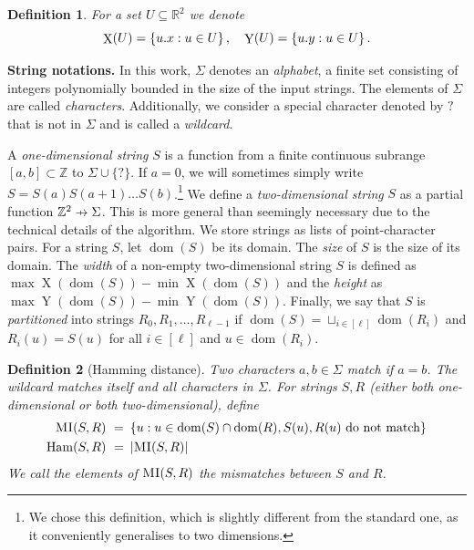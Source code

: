 \documentclass[twoside,leqno]{article}
\newtheorem{definition}{Definition}[section]
\newcommand{\R}{\mathbb{R}}
\newcommand{\Z}{\mathbb{Z}}
\newcommand{\set}[1]{\left\lbrace #1 \right\rbrace}
\DeclareMathOperator*{\X}{X}
\DeclareMathOperator*{\Y}{Y}
\DeclareMathOperator*{\Ham}{Ham}
\DeclareMathOperator*{\dom}{dom}
\DeclareMathOperator*{\chrome}{C}
\newcommand{\absolute}[1]{\left\lvert#1\right\rvert}
\begin{document}
\begin{definition}
	For a set $U \subseteq \R^2$ we denote
	\[ \X(U) = \set{\x{u} : u \in U}, \quad \Y(U) = \set{\y{u} : u \in U}.\]
\end{definition}


\newcommand{\wild}{\texttt{?}}
\noindent \textbf{String notations.} In this work, $\Sigma$ denotes an \emph{alphabet}, a finite set consisting of integers polynomially bounded in the size of the input strings. The elements of $\Sigma$ are called \emph{characters}. Additionally, we consider a special character denoted by $\wild$ that is not in $\Sigma$ and is called a \emph{wildcard}.

\newcommand{\getchar}[1]{\chrome(#1)}
\newcommand{\pto}{\mathrel{\ooalign{\hfil$\mapstochar\mkern5mu$\hfil\cr$\to$\cr}}}
\renewcommand{\d}[1]{\dom(#1)}
\newcommand{\f}[1]{#1^\mathbf{f}}

A \emph{one-dimensional string} $S$ is a function from a finite continuous subrange $[a,b]\subset \mathbb Z$ to $\Sigma \cup \{\wild\}$. If $a = 0$, we will sometimes simply write $S = S(a)S(a+1)\ldots S(b)$.\footnote{We chose this definition, which is slightly different from the standard one, as it conveniently generalises to two dimensions.} We define a \emph{two-dimensional string} $S$ as a partial function $\Z^2 \pto \Sigma$. This is more general than seemingly necessary due to the technical details of the algorithm. We store strings as lists of point-character pairs. For a string $S$, let $\d{S}$ be its domain. The \emph{size} of $S$ is the size of its domain. The \emph{width} of a non-empty two-dimensional string $S$ is defined as $\max \X(\d{S}) - \min \X(\d{S})$ and the \emph{height} as $\max \Y(\d{S}) - \min \Y(\d{S})$. Finally, we say that $S$ is \emph{partitioned} into strings $R_0, R_1, \ldots, R_{\ell-1}$ if $\d{S} = \sqcup_{i \in [\ell]} \d{R_i}$ and $R_i(u) = S(u)$ for all $i \in [\ell]$ and $u \in \d{R_i}$.

\newcommand{\MI}{\textnormal{\textsc{MI}}\xspace}

\begin{definition}[Hamming distance]
	Two characters $a,b \in \Sigma$ \emph{match} if $a = b$. The wildcard matches itself and all characters in $\Sigma$. 
	For strings $S, R$ (either both one-dimensional or both two-dimensional), define
	\begin{align*}
		\MI(S, R)\ =\ &\set{u : u \in \d{S} \cap \d{R}, S(u), R(u) \text{ do not match}}\\
		\Ham(S,R)\ =\ &\absolute{\MI(S,R)}
	\end{align*}			 
	We call the elements of $\MI(S,R)$ the \emph{mismatches} between $S$ and $R$.
\end{definition}
\end{document}
